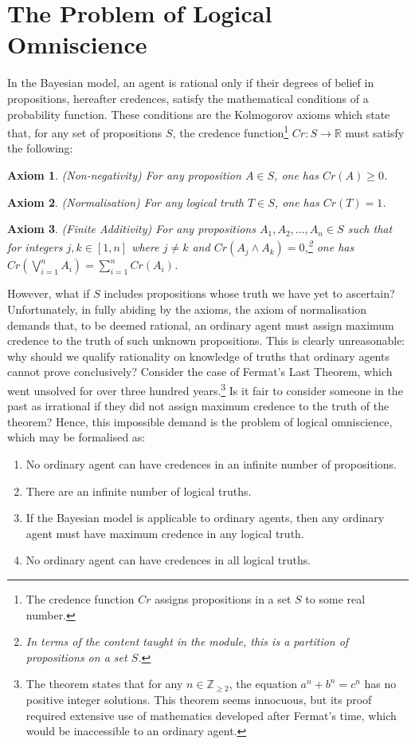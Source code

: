 \documentclass[12pt]{article}
\newtheorem{axiom}{Axiom}
\begin{document}
\section{The Problem of Logical Omniscience}
In the Bayesian model, an agent is rational only if their degrees of belief in propositions, hereafter credences, satisfy the mathematical conditions of a probability function.\autocite[13]{bdrc} These conditions are the Kolmogorov axioms which state that, for any set of propositions $S$, the credence function\footnote{The credence function $Cr$ assigns propositions in a set $S$ to some real number.} $Cr:S\rightarrow\mathbb{R}$ must satisfy the following:
\begin{axiom}
    (Non-negativity) For any proposition $A\in S$, one has $Cr(A)\geq0$.
\end{axiom}
\begin{axiom}
    (Normalisation) For any logical truth $T\in S$, one has $Cr(T)=1$.
\end{axiom}
\begin{axiom}
    (Finite Additivity) For any propositions $A_1, A_2,\dots, A_n\in S$ such that for integers $j,k\in[1,n]$ where $j\neq k$ and $Cr(A_j\land A_k)=0$,\footnote{In terms of the content taught in the module, this is a partition of propositions on a set $S$.} one has $Cr(\bigvee_{i=1}^{n}A_i)=\sum_{i=1}^{n}Cr(A_i)$.
\end{axiom}
However, what if $S$ includes propositions whose truth we have yet to ascertain? Unfortunately, in fully abiding by the axioms, the axiom of normalisation demands that, to be deemed rational, an ordinary agent must assign maximum credence to the truth of such unknown propositions. This is clearly unreasonable: why should we qualify rationality on knowledge of truths that ordinary agents cannot prove conclusively? Consider the case of Fermat's Last Theorem, which went unsolved for over three hundred years.\footnote{The theorem states that for any $n\in\mathbb{Z}_{\geq2}$, the equation $a^n+b^n=c^n$ has no positive integer solutions. This theorem seems innocuous, but its proof required extensive use of mathematics developed after Fermat's time, which would be inaccessible to an ordinary agent.} Is it fair to consider someone in the past as irrational if they did not assign maximum credence to the truth of the theorem?\autocite[108]{dogramaci} Hence, this impossible demand is the problem of logical omniscience, which may be formalised as:\autocite{youtube}
\begin{enumerate}[label=\textbf{P\arabic*:},leftmargin=0.5in]
    \item No ordinary agent can have credences in an infinite number of propositions.
    \item There are an infinite number of logical truths.
    \item If the Bayesian model is applicable to ordinary agents, then any ordinary agent must have maximum credence in any logical truth.
    \item No ordinary agent can have credences in all logical truths.
\end{enumerate}
\end{document}
